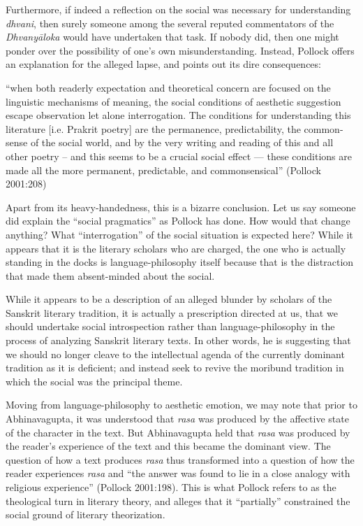 Furthermore, if indeed a reflection on the social was necessary for understanding \textsl{dhvani}, then surely someone among the several reputed commentators of the \textsl{Dhvanyāloka} would have undertaken that task. If nobody did, then one might ponder over the possibility of one's own misunderstanding. Instead, Pollock offers an explanation for the alleged lapse, and points out its dire consequences: 

\begin{myquote}
``when both readerly expectation and theoretical concern are focused on the linguistic mechanisms of meaning, the social conditions of aesthetic suggestion escape observation let alone interrogation. The conditions for understanding this literature [i.e. Prakrit poetry] are the permanence, predictability, the common-sense of the social world, and by the very writing and reading of this and all other poetry – and this seems to be a crucial social effect --- these conditions are made all the more permanent, predictable, and commonsensical''
\hfill (Pollock 2001:208)
\end{myquote}

Apart from its heavy-handedness, this is a bizarre conclusion. Let us say someone did explain the ``social pragmatics'' as Pollock has done. How would that change anything? What ``interrogation'' of the social situation is expected here? While it appears that it is the literary scholars who are charged, the one who is actually standing in the docks is language-philosophy itself because that is the distraction that made them absent-minded about the social. 

While it appears to be a description of an alleged blunder by scholars of the Sanskrit literary tradition, it is actually a prescription directed at us, that we should undertake social introspection rather than language-philosophy in the process of analyzing Sanskrit literary texts. In other words, he is suggesting that we should no longer cleave to the intellectual agenda of the currently dominant tradition as it is deficient; and instead seek to revive the moribund tradition in which the social was the principal theme.

Moving from language-philosophy to aesthetic emotion, we may note that prior to Abhinavagupta, it was understood that \textsl{rasa} was produced by the affective state of the character in the text. But Abhinavagupta held that \textsl{rasa} was produced by the reader's experience of the text and this became the dominant view. The question of how a text produces \textsl{rasa} thus transformed into a question of how the reader experiences \textsl{rasa} and ``the answer was found to lie in a close analogy with religious experience'' (Pollock 2001:198). This is what Pollock refers to as the theological turn in literary theory, and alleges that it ``partially'' constrained the social ground of literary theorization.

